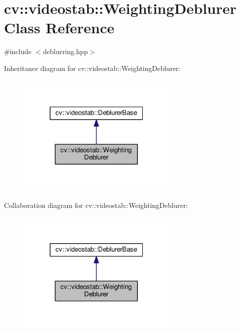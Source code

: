 \hypertarget{classcv_1_1videostab_1_1WeightingDeblurer}{\section{cv\-:\-:videostab\-:\-:Weighting\-Deblurer Class Reference}
\label{classcv_1_1videostab_1_1WeightingDeblurer}
}


{\ttfamily \#include $<$deblurring.\-hpp$>$}



Inheritance diagram for cv\-:\-:videostab\-:\-:Weighting\-Deblurer\-:\nopagebreak
\begin{figure}[H]
\begin{center}
\leavevmode
\includegraphics[width=220pt]{classcv_1_1videostab_1_1WeightingDeblurer__inherit__graph}
\end{center}
\end{figure}


Collaboration diagram for cv\-:\-:videostab\-:\-:Weighting\-Deblurer\-:\nopagebreak
\begin{figure}[H]
\begin{center}
\leavevmode
\includegraphics[width=220pt]{classcv_1_1videostab_1_1WeightingDeblurer__coll__graph}
\end{center}
\end{figure}
